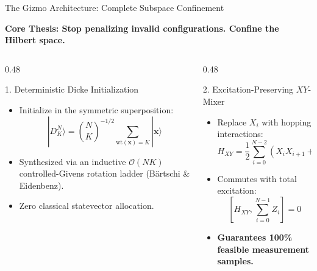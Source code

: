 \documentclass[aspectratio=169,10pt]{beamer}
\begin{document}
\begin{frame}{The Gizmo Architecture: Complete Subspace Confinement}
\begin{center}
\textbf{Core Thesis: Stop penalizing invalid configurations. Confine the Hilbert space.}
\end{center}

\vspace{0.2cm}
\begin{columns}
\begin{column}{0.48\textwidth}
\begin{block}{1. Deterministic Dicke Initialization}
\begin{itemize}
    \item Initialize in the symmetric superposition:
    \begin{equation*}
    |D_K^N\rangle = \binom{N}{K}^{-1/2} \sum_{\text{wt}(\mathbf{x})=K} |\mathbf{x}\rangle
    \end{equation*}
    \item Synthesized via an inductive $\mathcal{O}(NK)$ controlled-Givens rotation ladder (Bärtschi \& Eidenbenz).
    \item Zero classical statevector allocation.
\end{itemize}
\end{block}
\end{column}

\begin{column}{0.48\textwidth}
\begin{block}{2. Excitation-Preserving $XY$-Mixer}
\begin{itemize}
    \item Replace $X_i$ with hopping interactions:
    \begin{equation*}
    H_{XY} = \frac{1}{2} \sum_{i=0}^{N-2} \left(X_i X_{i+1} + Y_i Y_{i+1}\right)
    \end{equation*}
    \item Commutes with total excitation:
    \begin{equation*}
    \left[H_{XY}, \sum_{i=0}^{N-1} Z_i\right] = 0
    \end{equation*}
    \item \textbf{Guarantees 100\% feasible measurement samples.}
\end{itemize}
\end{block}
\end{column}
\end{columns}
\end{frame}
\end{document}
